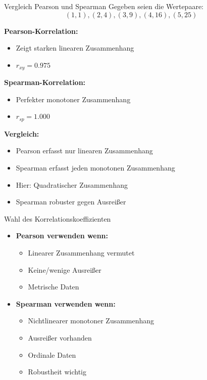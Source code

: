 \begin{example2}{Vergleich Pearson und Spearman}
Gegeben seien die Wertepaare:
$$(1,1), (2,4), (3,9), (4,16), (5,25)$$

\textbf{Pearson-Korrelation:}
\begin{itemize}
    \item Zeigt starken linearen Zusammenhang
    \item $r_{xy} = 0.975$
\end{itemize}

\textbf{Spearman-Korrelation:}
\begin{itemize}
    \item Perfekter monotoner Zusammenhang
    \item $r_{sp} = 1.000$
\end{itemize}

\textbf{Vergleich:}
\begin{itemize}
    \item Pearson erfasst nur linearen Zusammenhang
    \item Spearman erfasst jeden monotonen Zusammenhang
    \item Hier: Quadratischer Zusammenhang
    \item Spearman robuster gegen Ausreißer
\end{itemize}
\end{example2}

\begin{remark}{Wahl des Korrelationskoeffizienten}\\
\begin{itemize}
    \item \textbf{Pearson verwenden wenn:}
        \begin{itemize}
            \item Linearer Zusammenhang vermutet
            \item Keine/wenige Ausreißer
            \item Metrische Daten
        \end{itemize}
    \item \textbf{Spearman verwenden wenn:}
        \begin{itemize}
            \item Nichtlinearer monotoner Zusammenhang
            \item Ausreißer vorhanden
            \item Ordinale Daten
            \item Robustheit wichtig
        \end{itemize}
\end{itemize}
\end{remark}

